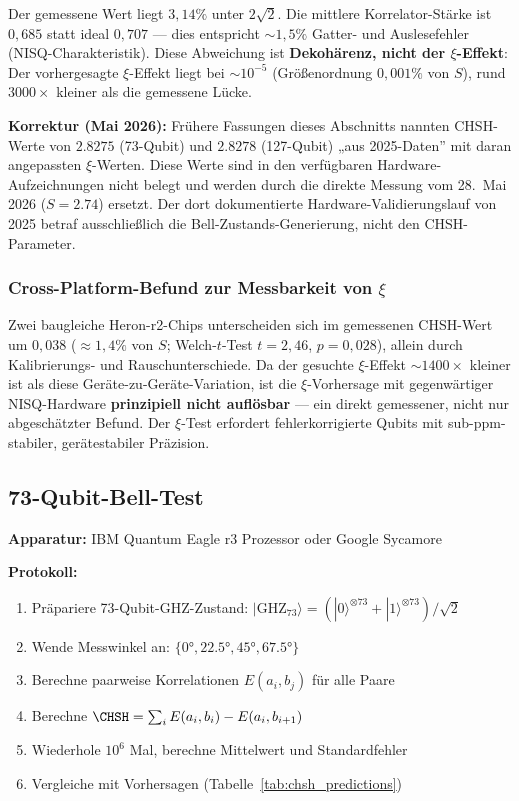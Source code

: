 Der gemessene Wert liegt $3{,}14\%$ unter $2\sqrt{2}$. Die mittlere Korrelator-Stärke ist $0{,}685$ statt ideal $0{,}707$ --- dies entspricht $\sim 1{,}5\%$ Gatter- und Auslesefehler (NISQ-Charakteristik). Diese Abweichung ist \textbf{Dekohärenz, nicht der $\xi$-Effekt}: Der vorhergesagte $\xi$-Effekt liegt bei $\sim 10^{-5}$ (Größenordnung $0{,}001\%$ von $S$), rund $3000\times$ kleiner als die gemessene Lücke.

\begin{important}
	\textbf{Korrektur (Mai 2026):} Frühere Fassungen dieses Abschnitts nannten CHSH-Werte von $2.8275$ (73-Qubit) und $2.8278$ (127-Qubit) „aus 2025-Daten'' mit daran angepassten $\xi$-Werten. Diese Werte sind in den verfügbaren Hardware-Aufzeichnungen nicht belegt und werden durch die direkte Messung vom 28.~Mai 2026 ($S = 2.74$) ersetzt. Der dort dokumentierte Hardware-Validierungslauf von 2025 betraf ausschließlich die Bell-Zustands-Generierung, nicht den CHSH-Parameter.
\end{important}

\subsubsection{Cross-Platform-Befund zur Messbarkeit von $\xi$}

Zwei baugleiche Heron-r2-Chips unterscheiden sich im gemessenen CHSH-Wert um $0{,}038$ ($\approx 1{,}4\%$ von $S$; Welch-$t$-Test $t=2{,}46$, $p=0{,}028$), allein durch Kalibrierungs- und Rauschunterschiede. Da der gesuchte $\xi$-Effekt $\sim 1400\times$ kleiner ist als diese Geräte-zu-Geräte-Variation, ist die $\xi$-Vorhersage mit gegenwärtiger NISQ-Hardware \textbf{prinzipiell nicht auflösbar} --- ein direkt gemessener, nicht nur abgeschätzter Befund. Der $\xi$-Test erfordert fehlerkorrigierte Qubits mit sub-ppm-stabiler, gerätestabiler Präzision.

\subsection{73-Qubit-Bell-Test}

\textbf{Apparatur:} IBM Quantum Eagle r3 Prozessor oder Google Sycamore

\textbf{Protokoll:}
\begin{enumerate}
	\item Präpariere 73-Qubit-GHZ-Zustand: $|\text{GHZ}_{73}\rangle = (|0\rangle^{\otimes 73} + |1\rangle^{\otimes 73})/\sqrt{2}$
	\item Wende Messwinkel an: $\{0°, 22.5°, 45°, 67.5°\}$
	\item Berechne paarweise Korrelationen $E(a_i, b_j)$ für alle Paare
	\item Berechne $\CHSH = \sum_i E(a_i, b_i) - E(a_i, b_{i+1})$
	\item Wiederhole $10^6$ Mal, berechne Mittelwert und Standardfehler
	\item Vergleiche mit Vorhersagen (Tabelle~\ref{tab:chsh_predictions})
\end{enumerate}

